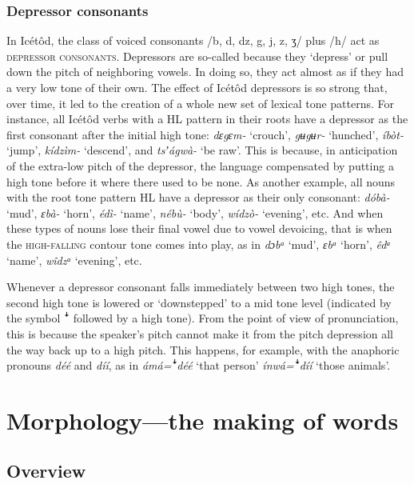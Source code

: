 \subsubsection{Depressor consonants}

In Icétôd, the class of voiced consonants /b, d, dz, g, j, z, ʒ/ plus /h/ act as \textsc{depressor consonants}. Depressors are so-called because they ‘depress’ or pull down the pitch of neighboring vowels. In doing so, they act almost as if they had a very low tone of their own. The effect of Icétôd depressors is so strong that, over time, it led to the creation of a whole new set of lexical tone patterns. For instance, all Icétôd verbs with a HL pattern in their roots have a depressor as the first consonant after the initial high tone: \textit{dɛgɛm-} ‘crouch’, \textit{gʉgʉr-} ‘hunched’, \textit{íbòt-} ‘jump’, \textit{kídzìm-} ‘descend’, and \textit{tsʼágwà-} ‘be raw’. This is because, in anticipation of the extra-low pitch of the depressor, the language compensated by putting a high tone before it where there used to be none. As another example, all nouns with the root tone pattern HL have a depressor as their only consonant: \textit{dóbà-} ‘mud’, \textit{ɛbà-} ‘horn’, \textit{édì-} ‘name’, \textit{nébù-} ‘body’, \textit{wídzò-} ‘evening’, etc. And when these types of nouns lose their final vowel due to vowel devoicing, that is when the \textsc{high-falling} contour tone comes into play, as in \textit{dɔbᵃ} ‘mud’, \textit{ɛbᵃ} ‘horn’, \textit{êdᵃ} ‘name’, \textit{wîdzᵃ} ‘evening’, etc.

Whenever a depressor consonant falls immediately between two high tones, the second high tone is lowered or ‘downstepped’ to a mid tone level (indicated by the symbol ꜜ followed by a high tone). From the point of view of pronunciation, this is because the speaker’s pitch cannot make it from the pitch depression all the way back up to a high pitch. This happens, for example, with the anaphoric pronouns \textit{déé} and \textit{díí}, as in \textit{ámá=}\textit{ꜜ}\textit{déé} ‘that person’ \textit{ínwá=ꜜdíí} ‘those animals’.
 
\section{Morphology—the making of words}
 
\subsection{Overview}


